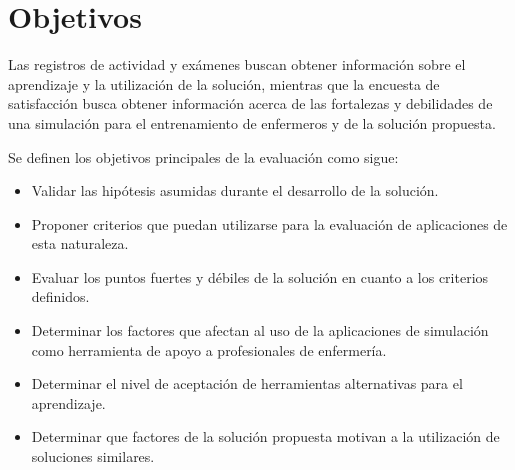 \section{Objetivos}
\label{sec:objetivos}

Las registros de actividad y exámenes buscan obtener información sobre el
aprendizaje y la utilización de la solución, mientras que la encuesta de
satisfacción busca obtener información acerca de las fortalezas y debilidades de
una simulación para el entrenamiento de enfermeros y de la solución propuesta.

Se definen los objetivos principales de la evaluación como sigue:

\begin{itemize}

\item Validar las hipótesis asumidas durante el desarrollo de la solución.

\item Proponer criterios que puedan utilizarse para la evaluación de
    aplicaciones de esta naturaleza.

\item Evaluar los puntos fuertes y débiles de la solución en cuanto a los criterios definidos.

\item Determinar los factores que afectan al uso de la aplicaciones de
    simulación como herramienta de apoyo a profesionales de enfermería.

\item Determinar el nivel de aceptación de herramientas alternativas para el
    aprendizaje.

\item Determinar que factores de la solución propuesta motivan a la utilización
    de soluciones similares.

\end{itemize}









